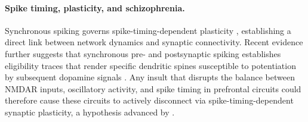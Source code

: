 \paragraph{Spike timing, plasticity, and schizophrenia.}
Synchronous spiking governs spike-timing-dependent plasticity
\citep{dan2004spike}, establishing a direct link between network dynamics
and synaptic connectivity. Recent evidence further suggests that synchronous
pre- and postsynaptic spiking establishes eligibility traces that render
specific dendritic spines susceptible to potentiation by subsequent dopamine
signals \citep{he2015eligibility, yagishita2014critical}. Any insult that
disrupts the balance between NMDAR inputs, oscillatory activity, and spike
timing in prefrontal circuits could therefore cause these circuits to
actively disconnect via spike-timing-dependent synaptic plasticity, a
hypothesis advanced by \citet{zick2018blocking, zick2021disparate}.
